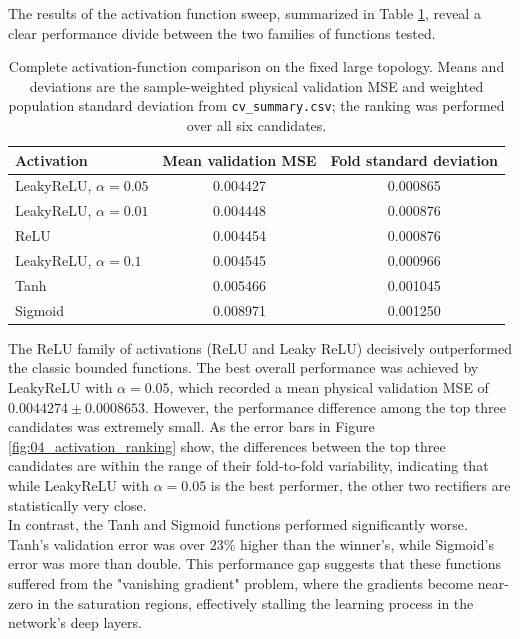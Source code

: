 The results of the activation function sweep, summarized in Table \ref{tab:04_activation_results}, reveal a clear performance divide between the two families of functions tested.\\

\begin{table}[h!]
    \centering
    \begin{tabular}{lcc}
        \hline
        Activation & Mean validation MSE & Fold standard deviation \\
        \hline
        LeakyReLU, $\alpha=0.05$ & 0.004427 & 0.000865 \\
        LeakyReLU, $\alpha=0.01$ & 0.004448 & 0.000876 \\
        ReLU & 0.004454 & 0.000876 \\
        LeakyReLU, $\alpha=0.1$ & 0.004545 & 0.000966 \\
        Tanh & 0.005466 & 0.001045 \\
        Sigmoid & 0.008971 & 0.001250 \\
        \hline
    \end{tabular}
    \caption{Complete activation-function comparison on the fixed large topology. Means and deviations are the sample-weighted physical validation MSE and weighted population standard deviation from \texttt{cv\_summary.csv}; the ranking was performed over all six candidates.}
    \label{tab:04_activation_results}
\end{table}

The ReLU family of activations (ReLU and Leaky ReLU) decisively outperformed the classic bounded functions. The best overall performance was achieved by LeakyReLU with $\alpha=0.05$, which recorded a mean physical validation MSE of $0.0044274\pm0.0008653$. However, the performance difference among the top three candidates was extremely small. As the error bars in Figure \ref{fig:04_activation_ranking} show, the differences between the top three candidates are within the range of their fold-to-fold variability, indicating that while LeakyReLU with $\alpha=0.05$ is the best performer, the other two rectifiers are statistically very close.\\

In contrast, the Tanh and Sigmoid functions performed significantly worse. Tanh's validation error was over $23\%$ higher than the winner's, while Sigmoid's error was more than double. This performance gap suggests that these functions suffered from the "vanishing gradient" problem, where the gradients become near-zero in the saturation regions, effectively stalling the learning process in the network's deep layers.\\


